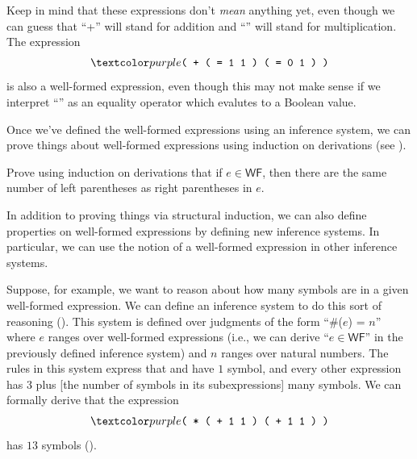 \begin{remark}
  Keep in mind that these expressions don't \textit{mean} anything yet, even though we can guess that \enquote{\codel+} will stand for addition and \enquote{\codel{*}} will stand for multiplication.
  The expression
  \begin{align*}
    \codel{( + ( = 1 1 ) ( = 0 1 ) )}
  \end{align*}
  is also a well-formed expression, even though this may not make sense if we interpret \enquote{\codel{=}} as an equality operator which evalutes to a Boolean value.
\end{remark}
%
Once we've defined the well-formed expressions using an inference system, we can prove things about well-formed expressions using induction on derivations (see ).
\begin{exercise}
  Prove using induction on derivations that if $e \in \mathsf{WF}$, then there are the same number of left parentheses as right parentheses in $e$.
\end{exercise}
%
In addition to proving things via structural induction, we can also define properties on well-formed expressions by defining new inference systems.
In particular, we can use the notion of a well-formed expression in other inference systems.

Suppose, for example, we want to reason about how many symbols are in a given well-formed expression.
We can define an inference system to do this sort of reasoning ().
This system is defined over judgments of the form \enquote{\#($e$) = $n$} where $e$ ranges over well-formed expressions (i.e., we can derive \enquote{$e \in \mathsf{WF}$} in the previously defined inference system) and $n$ ranges over natural numbers.
The rules in this system express that  and  have $1$ symbol, and every other expression has 3 plus [the number of symbols in its subexpressions] many symbols.
We can formally derive that the expression
\begin{align*}
  \codel{( * ( + 1 1 ) ( + 1 1 ) )}
\end{align*}
has $13$ symbols ().


